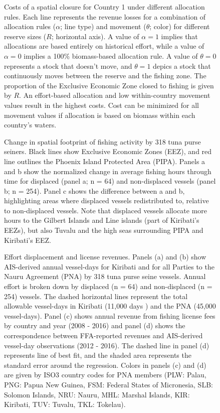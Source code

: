 \documentclass[12pt]{article}
\begin{document}
\begin{figure}[htbp]
\centering
\caption{\label{fig:allocation_cost_plot}Costs of a spatial closure for Country 1 under different allocation rules. Each line represents the revenue losses for a combination of allocation rules ($\alpha$; line type) and movement ($\theta$; color) for different reserve sizes ($R$; horizontal axis). A value of $\alpha = 1$ implies that allocations are based entirely on historical effort, while a value of $\alpha = 0$ implies a 100\% biomass-based allocation rule. A value of $\theta = 0$ represents a stock that doesn't move, and $\theta = 1$ depics a stock that continuously moves between the reserve and the fishing zone. The proportion of the Exclusive Economic Zone closed to fishing is given by $R$. An effort-based allocation and low within-country movement values result in the highest costs. Cost can be minimized for all movement values if allocation is based on biomass within each country's waters.}
\end{figure}

\begin{figure}
\centering
\caption{\label{fig:fishing_raster_diff}Change in spatial footprint of fishing activity by 318 tuna purse seiners. Black lines show Exclusive Economic Zones (EEZ), and red line outlines the Phoenix Island Protected Area (PIPA). Panels a and b show the normalized change in average fishing hours through time for displaced (panel a; n = 64) and non-displaced vessels (panel b; n = 254). Panel c shows the difference between a and b, highlighting areas where displaced vessels redistributed to, relative to non-displaced vessels. Note that displaced vessels allocate more hours to the Gilbert Islands and Line islands (part of Kiribati's EEZs), but also Tuvalu and the high seas surrounding PIPA and Kiribati's EEZ.}
\end{figure}

\begin{figure}[htbp]
\centering
\caption{\label{fig:empirical}Effort displacement and license revenues. Panels (a) and (b) show AIS-derived annual vessel-days for Kiribati and for all Parties to the Nauru Agreement (PNA) by 318 tuna purse seine vessels. Annual effort is broken down by displaced (n = 64) and non-displaced (n = 254) vessels. The dashed horizontal lines represent the total allowable vessel-days in Kiribati (11,000 days \cite{yeeting2018stabilising}) and the PNA (45,000 vessel-days). Panel (c) shows annual revenue from fishing license fees by country and year (2008 - 2016) and panel (d) shows the correspondence between FFA-reported revenues and AIS-derived vessel-day observations (2012 - 2016). The dashed line in panel (d) represents line of best fit, and the shaded area represents the standard error around the regression. Colors in panels (c) and (d) are given by ISO3 country codes for PNA members (PLW: Palau, PNG: Papua New Guinea, FSM: Federal States of Micronesia, SLB: Solomon Islands, NRU: Nauru, MHL: Marshal Islands, KIR: Kiribati, TUV: Tuvalu, TKL: Tokelau).}
\end{figure}
\end{document}

